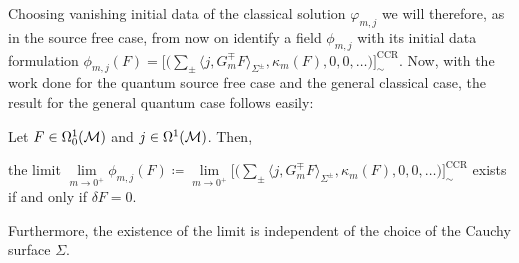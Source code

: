 Choosing vanishing initial data of the classical solution $\varphi_{m,j}$ we will therefore, as in the source free case, from now on identify a field $\phi_{m,j}$ with its initial data formulation $\phi_{m,j}(F) =  \big[\big( \sum_{\pm}\langle j , G_m^\mp F \rangle_{\Sigma^\pm} , \kappa_m(F) , 0 , 0, \dots\big)\big]^\text{CCR}_\sim$. Now, with the work done for the quantum source free case and the general classical case, the result for the general quantum case follows easily:
%
\begin{theorem}\label{thm:limit_existence_general}
Let $F \in \Omega^1_0(\mathcal{M})$ and $j \in \Omega^1(\mathcal{M})$. Then,
\begin{center}
	the limit $\lim\limits_{m \to 0^+}  \phi_{m,j}(F) \coloneqq \lim\limits_{m \to 0^+} \big[\big( \sum_{\pm}\langle j , G_m^\mp F \rangle_{\Sigma^\pm} , \kappa_m(F) , 0 , 0, \dots\big)\big]^\text{CCR}_\sim $ exists\\[2.5mm] if and only if ${\delta F} = 0 $.
\end{center}
Furthermore, the existence of the limit is independent of the choice of the Cauchy surface $\Sigma$.
\end{theorem}

